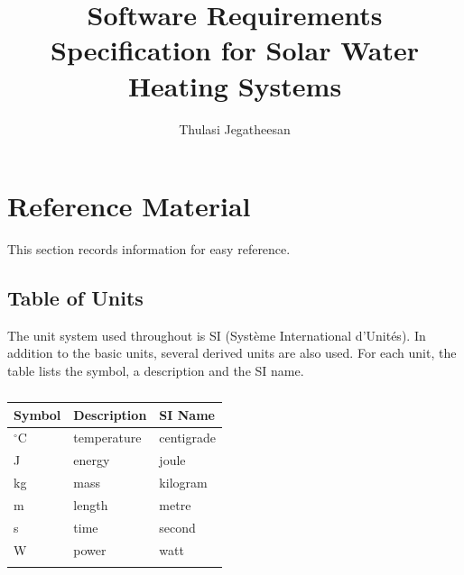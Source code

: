 \documentclass[12pt]{article}
\title{Software Requirements Specification for Solar Water Heating Systems}
\author{Thulasi Jegatheesan}
\begin{document}
\maketitle
\tableofcontents
\newpage
\section{Reference Material}
\label{Sec:RefMat}
This section records information for easy reference.
\subsection{Table of Units}
\label{Sec:ToU}
The unit system used throughout is SI (Système International d'Unités). In addition to the basic units, several derived units are also used. For each unit, the table lists the symbol, a description and the SI name.
\begin{longtable}{l l l}
\toprule
\textbf{Symbol} & \textbf{Description} & \textbf{SI Name}
\\
\midrule
\endhead
${}^{\circ}$C & temperature & centigrade
\\
J & energy & joule
\\
kg & mass & kilogram
\\
m & length & metre
\\
s & time & second
\\
W & power & watt
\\
\bottomrule
\caption{}
\label{Table:ToU}
\end{longtable}
\end{document}
